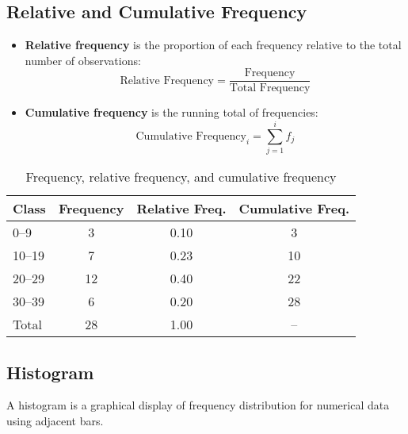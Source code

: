 \subsection{Relative and Cumulative Frequency}

\begin{itemize}
    \item \textbf{Relative frequency} is the proportion of each frequency relative to the total number of observations:
    \[
    \text{Relative Frequency} = \frac{\text{Frequency}}{\text{Total Frequency}}
    \]
    
    \item \textbf{Cumulative frequency} is the running total of frequencies:
    \[
    \text{Cumulative Frequency}_i = \sum_{j=1}^{i} f_j
    \]
\end{itemize}

\begin{table}[h!]
\centering
\begin{tabular}{|l|c|c|c|}
\hline
\textbf{Class} & \textbf{Frequency} & \textbf{Relative Freq.} & \textbf{Cumulative Freq.} \\
\hline
0–9   & 3  & 0.10 & 3 \\
10–19 & 7  & 0.23 & 10 \\
20–29 & 12 & 0.40 & 22 \\
30–39 & 6  & 0.20 & 28 \\
\hline
Total & 28 & 1.00 & -- \\
\hline
\end{tabular}
\caption{Frequency, relative frequency, and cumulative frequency}
\end{table}

\subsection{Histogram}

A histogram is a graphical display of frequency distribution for numerical data using adjacent bars.

\begin{center}
\end{center}

